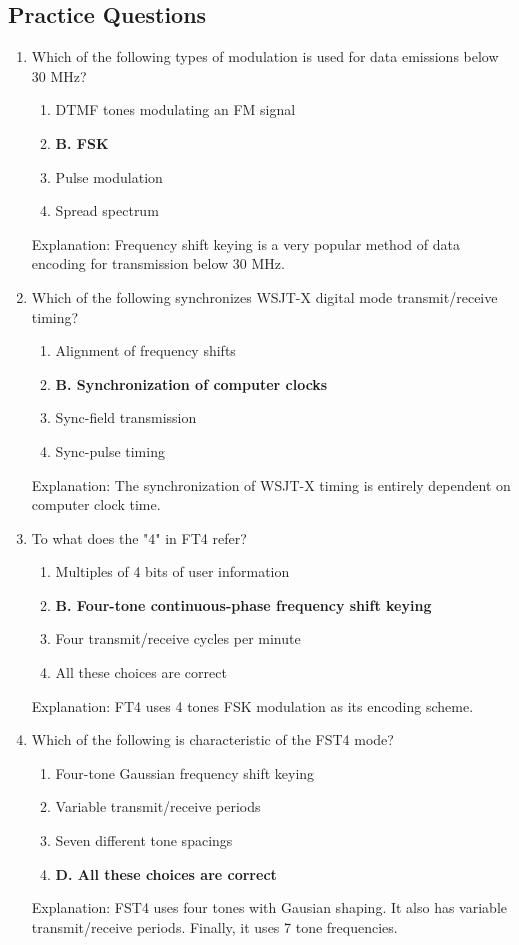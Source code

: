 \subsection*{Practice Questions}
\begin{enumerate}
   \item Which of the following types of modulation is used for data emissions below 30 MHz?
    \begin{enumerate}
        \item  DTMF tones modulating an FM signal
        \item \textbf{B. FSK}
        \item  Pulse modulation
        \item  Spread spectrum
    \end{enumerate}
    \textcolor{myred}{Explanation:}
   Frequency shift keying is a very popular method of data encoding for transmission below 30 MHz.
       
    \item Which of the following synchronizes WSJT-X digital mode transmit/receive timing?
    \begin{enumerate}
        \item  Alignment of frequency shifts
        \item \textbf{B. Synchronization of computer clocks}
       \item  Sync-field transmission
        \item  Sync-pulse timing
    \end{enumerate}
    \textcolor{myred}{Explanation:}
        The synchronization of WSJT-X timing is entirely dependent on computer clock time.
        
    \item To what does the "4" in FT4 refer?
    \begin{enumerate}
        \item  Multiples of 4 bits of user information
        \item \textbf{B. Four-tone continuous-phase frequency shift keying}
        \item  Four transmit/receive cycles per minute
         \item  All these choices are correct
    \end{enumerate}
    \textcolor{myred}{Explanation:}
     FT4 uses 4 tones FSK modulation as its encoding scheme.
        
        \item Which of the following is characteristic of the FST4 mode?
      \begin{enumerate}
         \item  Four-tone Gaussian frequency shift keying
        \item  Variable transmit/receive periods
         \item  Seven different tone spacings
       \item \textbf{D. All these choices are correct}
        \end{enumerate}
    \textcolor{myred}{Explanation:}
     FST4 uses four tones with Gausian shaping. It also has variable transmit/receive periods. Finally, it uses 7 tone frequencies.


\end{enumerate}
